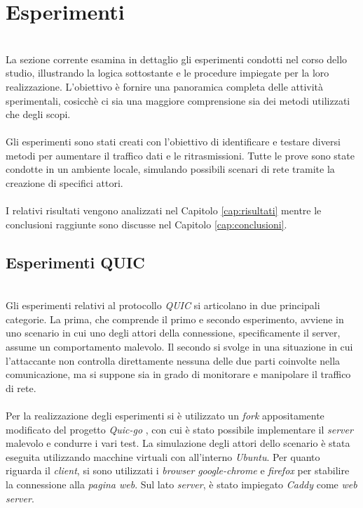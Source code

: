 \section{Esperimenti}
~\\
\indent La sezione corrente esamina in dettaglio gli esperimenti condotti nel corso dello studio, illustrando la logica sottostante e le procedure impiegate per la loro realizzazione. 
L'obiettivo è fornire una panoramica completa delle attività sperimentali, cosicchè ci sia una maggiore comprensione sia dei metodi utilizzati che degli scopi.
\\\\
Gli esperimenti sono stati creati con l'obiettivo di identificare e testare diversi metodi per aumentare il traffico dati e le ritrasmissioni.
Tutte le prove sono state condotte in un ambiente locale, simulando possibili scenari di rete tramite la creazione di specifici attori.
\\\\
I relativi risultati vengono analizzati nel Capitolo \ref{cap:risultati} mentre le conclusioni raggiunte sono discusse nel Capitolo \ref{cap:conclusioni}.

\subsection{Esperimenti QUIC}
~\\ 
\indent Gli esperimenti relativi al protocollo \emph{QUIC} si articolano in due principali categorie. 
La prima, che comprende il primo e secondo esperimento, avviene in uno scenario in cui uno degli attori della connessione, specificamente il server, assume un comportamento malevolo.
Il secondo si svolge in una situazione in cui l'attaccante non controlla direttamente nessuna delle due parti coinvolte nella comunicazione, ma si suppone sia in grado di monitorare e manipolare il traffico di rete.
\\\\
Per la realizzazione degli esperimenti si è utilizzato un \emph{fork} appositamente modificato del progetto \emph{Quic-go} \cite{site:my-fork}, 
con cui è stato possibile implementare il \emph{server} malevolo e condurre i vari test.
La simulazione degli attori dello scenario è stata eseguita utilizzando macchine virtuali con all'interno \emph{Ubuntu}.
Per quanto riguarda il \emph{client}, si sono utilizzati i \emph{browser} \emph{google-chrome} e \emph{firefox} per stabilire la connessione alla \emph{pagina web}. 
Sul lato \emph{server}, è stato impiegato \emph{Caddy} come \emph{web server}.

